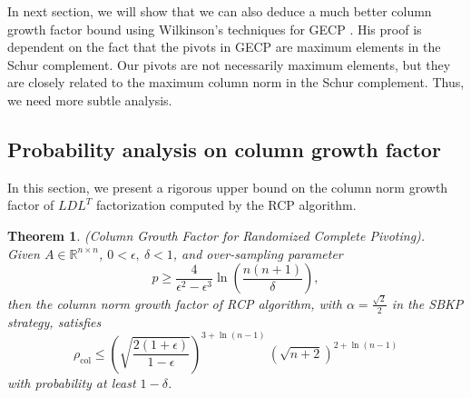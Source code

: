 \documentclass[11pt]{article}
\newtheorem{theorem}{Theorem}[section]
\begin{document}
In next section, we will show that we can also deduce a much better column growth factor bound using Wilkinson's techniques for GECP \cite{wilkinson1961error}. His proof is dependent on the fact that the pivots in GECP are maximum elements in the Schur complement. Our pivots are not necessarily maximum elements, but they are closely related to the maximum column norm in the Schur complement. Thus, we need more subtle analysis.

\subsection{Probability analysis on column growth factor}\label{Sec:Analysis of growth factor of RCP}
In this section, we present a rigorous upper bound on the column norm growth factor of $L D L^T$ factorization computed by the RCP algorithm. 

\begin{theorem}\label{Th:Column Growth Factor for RCP}
(Column Growth Factor for Randomized Complete Pivoting).\\ 
Given $A \in \mathbb{R}^{n \times n}$, $0 < \epsilon, ~\delta < 1$, and over-sampling parameter 
\[{\displaystyle p \ge \frac{4}{\epsilon^2 - \epsilon^3} \ln{ \left( \frac{n(n + 1)}{\delta} \right) },} \]
then the column norm growth factor of RCP algorithm, with $\alpha = \frac{\sqrt{2}}{2}$ in the SBKP strategy, satisfies
\begin{equation*}
   \rho_{\textrm{col}} \le \left(\sqrt{\frac{2(1 + \epsilon)}{1 - \epsilon}}\right)^{3 + \ln(n-1)} \, \left(\sqrt{n+2}\right)^{2 + \ln(n-1)} 
   \end{equation*}
with probability at least $1-\delta$.
\end{theorem}
\end{document}
